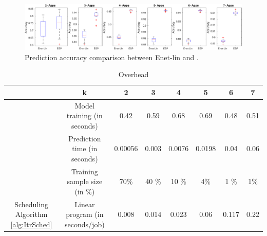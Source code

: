 \begin{figure}[t]
\begin{center}
 \includegraphics[width=1\textwidth]{figures/accuracy_boxplot_ridge_lasso_enet2.pdf}
 \caption{\small Prediction accuracy comparison between Enet-lin and
     \SYSTEM{}.
   }
\label{fig:est:box-plot}
\end{center}
\end{figure}

\begin{table}[t]
\centering
\caption{Overhead}
\footnotesize
\begin{tabular}{ c|c|c|c|c|c|c|c }
 \hline
 \hline
 &k & 2 & 3 &4 & 5 & 6 & 7 \\
 \hline
\multirow {3}{*}{\SYSTEM{}}  & Model training (in seconds)   & 0.42    & 0.59 &   0.68 & 0.69 & 0.48 & 0.51\\
& Prediction time (in seconds)  &   0.00056  & 0.003   &0.0076 & 0.0198 & 0.04 & 0.06\\
& Training sample size (in \%)  & 70\% & 40 \% &  10 \% & 4\% & 1 \% & 1\% \\ \hline \hline
\multirow {1}{*}{Scheduling Algorithm \ref{alg:ItrSched}}  & Linear program (in seconds/job) &   0.008 & 0.014 & 0.023 & 0.06 & 0.117 & 0.22\\
 \hline
 \hline
\end{tabular}
 \label{table:overhead}
\end{table}


